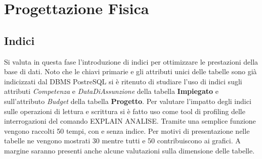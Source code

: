\documentclass{article}
\begin{document}
\newpage

\section{Progettazione Fisica}

\subsection{Indici}
Si valuta in questa fase l'introduzione di indici per ottimizzare le prestazioni della base di dati.
\newline
\newline
Noto che le chiavi primarie e gli attributi unici delle tabelle sono già indicizzati dal DBMS PostreSQL si è ritenuto di studiare l'uso di indici sugli attributi \textit{Competenza} e \textit{DataDiAssunzione} della tabella \textbf{Impiegato} e sull'attributo \textit{Budget} della tabella \textbf{Progetto}.
\newline
\newline
Per valutare l'impatto degli indici sulle operazioni di lettura e scrittura si è fatto uso come tool di profiling delle interrogazioni del comando EXPLAIN ANALISE.
\newline
\newline
Tramite una semplice funzione vengono raccolti 50 tempi, con e senza indice.
\newline
Per motivi di presentazione nelle tabelle ne vengono mostrati 30 mentre tutti e 50 contribuiscono ai grafici.
\newline
A margine saranno presenti anche alcune valutazioni sulla dimensione delle tabelle.
\end{document}
